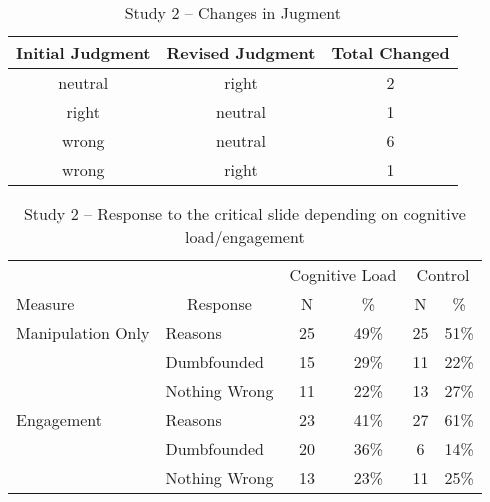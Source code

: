 \documentclass[
  american,
  man,floatsintext]{apa7}
\begin{document}
\newpage

\begin{table}[tbp]

\begin{center}
\begin{threeparttable}

\caption{\label{tab:tabS2change}Study 2 – Changes in Jugment}

\begin{tabular}{ccc}
\toprule
Initial Judgment & \multicolumn{1}{c}{Revised Judgment} & \multicolumn{1}{c}{Total Changed}\\
\midrule
neutral & right & 2\\
right & neutral & 1\\
wrong & neutral & 6\\
wrong & right & 1\\
\bottomrule
\end{tabular}

\end{threeparttable}
\end{center}

\end{table}

\begin{table}[tbp]

\begin{center}
\begin{threeparttable}

\caption{\label{tab:tabS2tab1dumb1all}Study 2 – Response to the critical slide depending on cognitive load/engagement}

\begin{tabular}{llcccc}
\toprule
 &  & \multicolumn{2}{c}{Cognitive Load} & \multicolumn{2}{c}{Control} \\
\cmidrule(r){3-4} \cmidrule(r){5-6}
Measure & \multicolumn{1}{c}{Response} & \multicolumn{1}{c}{N} & \multicolumn{1}{c}{\%} & \multicolumn{1}{c}{N} & \multicolumn{1}{c}{\%}\\
\midrule
Manipulation Only & Reasons & 25 & 49\% & 25 & 51\%\\
 & Dumbfounded & 15 & 29\% & 11 & 22\%\\
 & Nothing Wrong & 11 & 22\% & 13 & 27\%\\
Engagement & Reasons & 23 & 41\% & 27 & 61\%\\
 & Dumbfounded & 20 & 36\% & 6 & 14\%\\
 & Nothing Wrong & 13 & 23\% & 11 & 25\%\\
\bottomrule
\end{tabular}

\end{threeparttable}
\end{center}

\end{table}
\end{document}

